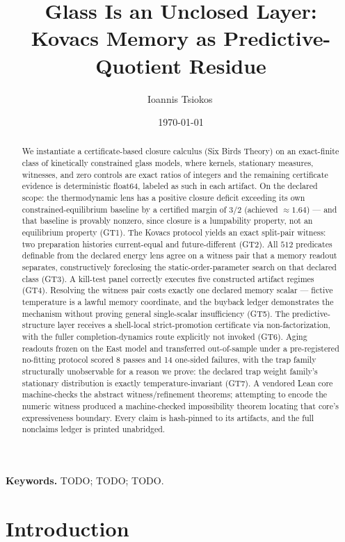 \documentclass[11pt]{article}
\title{Glass Is an Unclosed Layer:\\
  Kovacs Memory as Predictive-Quotient Residue}
\author{Ioannis Tsiokos\,\orcidlink{0009-0009-7659-5964}}
\date{\today}
\theoremstyle{definition}
\begin{document}
\maketitle
\thispagestyle{firstpage}

\begin{abstract}
We instantiate a certificate-based closure calculus (Six Birds Theory) on an exact-finite class of
kinetically constrained glass models, where kernels, stationary measures, witnesses, and zero
controls are exact ratios of integers and the remaining certificate evidence is deterministic
float64, labeled as such in each artifact. On the declared scope: the thermodynamic lens has a positive closure deficit exceeding its own
constrained-equilibrium baseline by a certified margin of $3/2$ (achieved $\approx 1.64$) --- and
that baseline is provably nonzero, since closure is a lumpability property, not an equilibrium
property (GT1). The Kovacs protocol yields an exact split-pair witness: two preparation histories
current-equal and future-different (GT2). All $512$ predicates definable from the declared energy
lens agree on a witness pair that a memory readout separates, constructively foreclosing the
static-order-parameter search on that declared class (GT3). A kill-test panel correctly executes
five constructed artifact regimes (GT4). Resolving the witness pair costs exactly one declared
memory scalar --- fictive temperature is a lawful memory coordinate, and the buyback ledger
demonstrates the mechanism without proving general single-scalar insufficiency (GT5). The
predictive-structure layer receives a shell-local strict-promotion certificate via
non-factorization, with the fuller completion-dynamics route explicitly not invoked (GT6).
Aging readouts frozen on the East model and transferred out-of-sample under a pre-registered
no-fitting protocol scored 8 passes and 14 one-sided failures, with the trap family structurally
unobservable for a reason we prove: the declared trap weight family's stationary distribution is
exactly temperature-invariant (GT7). A vendored Lean core machine-checks the abstract
witness/refinement theorems; attempting to encode the numeric witness produced a machine-checked
impossibility theorem locating that core's expressiveness boundary. Every claim is hash-pinned to
its artifacts, and the full nonclaims ledger is printed unabridged.
\end{abstract}

\medskip
\noindent\textbf{Keywords.} TODO; TODO; TODO.

\section{Introduction}
\label{sec:intro}
\end{document}
